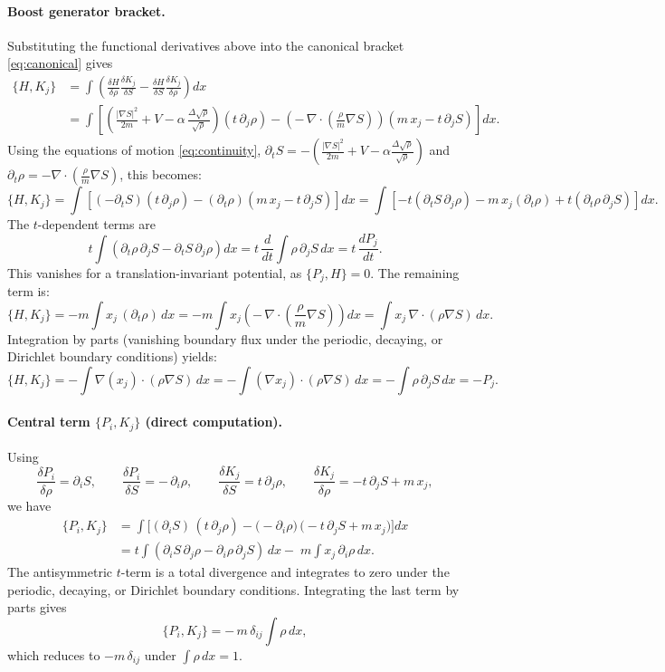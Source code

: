 \documentclass[11pt,a4paper]{article}
\numberwithin{equation}{section}
\theoremstyle{thmcompact}
\theoremstyle{remark}
\begin{document}
\paragraph{Boost generator bracket.}
Substituting the functional derivatives above into the canonical bracket \eqref{eq:canonical} gives
\begin{align*}
	\{H,K_j\}
	&=\int\!\!\left(
	\frac{\delta H}{\delta \rho}\frac{\delta K_j}{\delta S}
	-\frac{\delta H}{\delta S}\frac{\delta K_j}{\delta \rho}
	\right)\!dx \\[0.3em]
	&=\int\!\!\left[
	\left(\frac{|\nabla S|^2}{2m}+V-\alpha\,\frac{\Delta\sqrt\rho}{\sqrt\rho}\right)
	(t\,\partial_j\rho)
	-\!\left(-\,\nabla\!\cdot\!\!\left(\frac{\rho}{m}\nabla S\right)\right)
	(m\,x_j - t\,\partial_j S)
	\right]\!dx.
\end{align*}
Using the equations of motion \eqref{eq:continuity},
$\partial_t S = -(\frac{|\nabla S|^2}{2m}+V-\alpha\frac{\Delta\sqrt\rho}{\sqrt\rho})$
and $\partial_t\rho = -\nabla\!\cdot\!(\frac{\rho}{m}\nabla S)$, this becomes:
\[
\{H,K_j\} = \int\!\!\left[
(-\partial_t S)(t\,\partial_j\rho)
-(\partial_t \rho)(m\,x_j - t\,\partial_j S)
\right]dx
= \int\!\!\left[
-t(\partial_t S\,\partial_j\rho)
-m\,x_j(\partial_t\rho)
+t(\partial_t\rho\,\partial_j S)
\right]dx.
\]
The $t$-dependent terms are
\[
t \int (\partial_t\rho\,\partial_j S - \partial_t S\,\partial_j\rho)dx
= t\,\frac{d}{dt}\!\int\rho\,\partial_j S\,dx
= t\,\frac{d P_j}{dt}.
\]
This vanishes for a translation-invariant potential, as $\{P_j, H\}=0$. The remaining term is:
\[
\{H,K_j\} = -m\!\int x_j\,(\partial_t\rho)\,dx
= -m\!\int x_j \left(-\,\nabla\!\cdot\!\!\left(\frac{\rho}{m}\nabla S\right)\right)dx
= \int x_j\,\nabla\!\cdot\!(\rho\nabla S)\,dx.
\]
Integration by parts (vanishing boundary flux under the periodic, decaying, or
Dirichlet boundary conditions) yields:
\[
\{H,K_j\} = -\!\int \nabla(x_j)\!\cdot\!(\rho\nabla S)\,dx
= -\!\int (\nabla x_j)\!\cdot\!(\rho\nabla S)\,dx
= -\!\int \rho\,\partial_j S\,dx = -P_j.
\]

\paragraph{Central term \texorpdfstring{$\{P_i,K_j\}$}{\{P,K\}} (direct computation).}
Using
\[
\frac{\delta P_i}{\delta \rho}=\partial_i S,\qquad
\frac{\delta P_i}{\delta S}=-\,\partial_i\rho,
\qquad
\frac{\delta K_j}{\delta S}=t\,\partial_j\rho,\qquad
\frac{\delta K_j}{\delta \rho}=-t\,\partial_j S+m\,x_j,
\]
we have
\begin{align*}
	\{P_i,K_j\}
	&=\int\!\Big[
	(\partial_i S)\,(t\,\partial_j\rho)
	-\big(-\partial_i\rho\big)\,\big(-t\,\partial_j S+m\,x_j\big)
	\Big]dx\\
	&= t\!\int\!(\partial_i S\,\partial_j\rho-\partial_i\rho\,\partial_j S)\,dx
	-\;m\!\int x_j\,\partial_i\rho\,dx.
\end{align*}
The antisymmetric $t$-term is a total divergence and integrates to zero under
the periodic, decaying, or Dirichlet boundary conditions. Integrating the last
term by parts gives
\[
\{P_i,K_j\}=-\,m\,\delta_{ij}\!\int\!\rho\,dx,
\]
which reduces to $-m\,\delta_{ij}$ under $\int\rho\,dx=1$.
\end{document}
